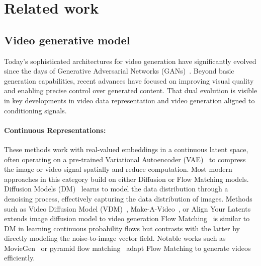 \section{Related work}
\label{sec:related}

\subsection{Video generative model}


Today's sophisticated architectures for video generation have significantly evolved since the days of Generative Adversarial Networks (GANs)~\cite{goodfellow2020gan, saito2017tgan, tulyakov2018mocogan}. Beyond basic generation capabilities, recent advances have focused on improving visual quality and enabling precise control over generated content. That dual evolution is visible in key developments in video data representation and video generation aligned to conditioning signals.


\paragraph{Continuous Representations:} These methods work with real-valued embeddings in a continuous latent space, often operating on a pre-trained Variational Autoencoder (VAE)~\cite{kingma2013vae,higgins2017betavae} to compress the image or video signal spatially and reduce computation.  
Most modern approaches in this category build on either Diffusion or Flow Matching models. Diffusion Models (DM)~\cite{ho2020ddpm,rombach2022ldm} learns to model the data distribution through a denoising process, effectively capturing the data distribution of images. Methods such as Video Diffusion Model (VDM)~\cite{ho2022vdm}, Make-A-Video~\cite{singer2023makeavideo}, or Align Your Latents~\cite{blattmann2023align} extends image diffusion model to video generation 
Flow Matching~\cite{lipman2023flow} is similar to DM in learning continuous probability flows but contrasts with the latter by directly modeling the noise-to-image vector field.
Notable works such as MovieGen~\cite{polyak2024movie} or pyramid flow matching~\cite{jin2024pyramidal} adapt Flow Matching to generate videos efficiently.

